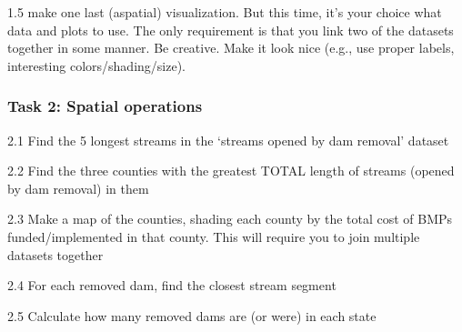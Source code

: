 \documentclass[]{article}
\begin{document}
1.5 make one last (aspatial) visualization. But this time, it's your
choice what data and plots to use. The only requirement is that you link
two of the datasets together in some manner. Be creative. Make it look
nice (e.g., use proper labels, interesting colors/shading/size).

\subsubsection{Task 2: Spatial
operations}\label{task-2-spatial-operations}

2.1 Find the 5 longest streams in the `streams opened by dam removal'
dataset

2.2 Find the three counties with the greatest TOTAL length of streams
(opened by dam removal) in them

2.3 Make a map of the counties, shading each county by the total cost of
BMPs funded/implemented in that county. This will require you to join
multiple datasets together

2.4 For each removed dam, find the closest stream segment

2.5 Calculate how many removed dams are (or were) in each state
\end{document}
